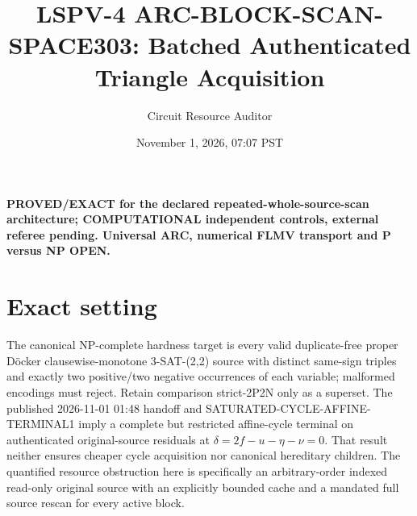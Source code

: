 \documentclass[11pt]{article}
\title{LSPV-4 ARC-BLOCK-SCAN-SPACE303: Batched Authenticated Triangle Acquisition}
\author{Circuit Resource Auditor}
\date{November 1, 2026, 07:07 PST}
\begin{document}
\maketitle
\noindent\textbf{PROVED/EXACT for the declared repeated-whole-source-scan architecture; COMPUTATIONAL independent controls, external referee pending. Universal ARC, numerical FLMV transport and P versus NP OPEN.}

\section{Exact setting}
The canonical NP-complete hardness target is every valid duplicate-free proper D\"ocker clausewise-monotone 3-SAT-(2,2) source with distinct same-sign triples and exactly two positive/two negative occurrences of each variable; malformed encodings must reject. Retain comparison strict-2P2N only as a superset. The published 2026-11-01 01:48 handoff and SATURATED-CYCLE-AFFINE-TERMINAL1 imply a complete but restricted affine-cycle terminal on authenticated original-source residuals at $\delta=2f-u-\eta-\nu=0$. That result neither ensures cheaper cycle acquisition nor canonical hereditary children. The quantified resource obstruction here is specifically an arbitrary-order indexed read-only original source with an explicitly bounded cache and a mandated full source rescan for every active block.
\end{document}
